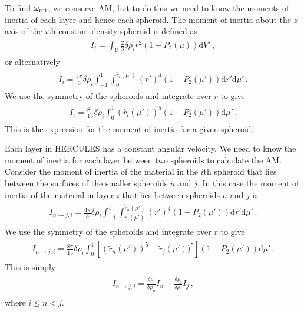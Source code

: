\documentclass[11pt, oneside]{article}   	%
\begin{document}
To find $\omega_{\rm rot}$, we conserve AM, but to do this we need to know the moments of inertia of each layer and hence each spheroid.
The moment of inertia about the $z$ axis of the $i$th constant-density spheroid is defined as
%
\begin{align}
\begin{aligned}
I_i=\int_{\mathcal{V}} \frac{2}{3} \delta \rho_i r^2 (1-P_2(\mu)) \mathrm{d}V' \,,
\end{aligned}
\end{align}
%
or alternatively
%
\begin{align}
\begin{aligned}
I_i=\frac{4 \pi}{3} \delta \rho_i  \int_{-1}^{1} \int_0^{\tilde{r_i}(\mu')} (r')^4 (1-P_2(\mu')) \mathrm{d}r' \mathrm{d}\mu' \,.
\end{aligned}
\end{align}
%
We use the symmetry of the spheroids and integrate over $r$ to give
%
\begin{align}
\begin{aligned}
I_i=\frac{8 \pi}{15} \delta \rho_i  \int_{0}^{1}  (\tilde{r_i}(\mu'))^5 (1-P_2(\mu')) \mathrm{d}\mu' \,.
\end{aligned}
\end{align}
%
This is the expression for the moment of inertia for a given spheroid. 

Each layer in HERCULES has a constant angular velocity.
We need to know the moment of inertia for each layer between two spheroids to calculate the AM.
Consider the moment of inertia of the material in the $i$th spheroid that lies between the surfaces of the smaller spheroids $n$ and $j$.
In this case the moment of inertia of the material in layer $i$ that lies between spheroids $n$ and $j$ is
%
\begin{align}
\begin{aligned}
I_{n\rightarrow j, i}=\frac{4 \pi}{3} \delta \rho_i  \int_{-1}^{1} \int_{\tilde{r}_{j}(\mu')}^{\tilde{r}_n(\mu')} (r')^4 (1-P_2(\mu'))\mathrm{d}r' \mathrm{d}\mu'  \,.
\end{aligned}
\end{align}
%
We use the symmetry of the spheroids and integrate over $r$ to give
%
\begin{align}
\begin{aligned}
I_{n\rightarrow j,i}=\frac{8 \pi}{15} \delta \rho_i  \int_{0}^{1}  \left [ (\tilde{r}_n(\mu'))^5 -\tilde{r}_j(\mu'))^5 \right ] (1-P_2(\mu')) \mathrm{d}\mu' \,.
\end{aligned}
\end{align}
%
This is simply
%
\begin{align}
\begin{aligned}
I_{n\rightarrow j,i}=\frac{\delta\rho_i}{\delta\rho_n} I_n - \frac{\delta\rho_i}{\delta\rho_j} I_j \,,
\end{aligned}
\end{align}
%
where $i\leq n<j$.
\end{document}
